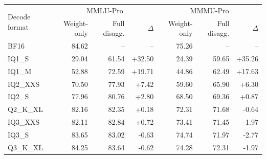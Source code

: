 \begin{tabular}{l|rrr|rrr}
\toprule
\multirow{2}{*}{Decode format} & \multicolumn{3}{c|}{MMLU-Pro} & \multicolumn{3}{c}{MMMU-Pro} \\
 & Weight-only & Full disagg. & $\Delta$ & Weight-only & Full disagg. & $\Delta$ \\
\midrule
BF16 & 84.62 & -- & -- & 75.26 & -- & -- \\
\midrule
IQ1\_S & 29.04 & 61.54 & +32.50 & 24.39 & 59.65 & +35.26 \\
IQ1\_M & 52.88 & 72.59 & +19.71 & 44.86 & 62.49 & +17.63 \\
IQ2\_XXS & 70.50 & 77.93 & +7.42 & 59.60 & 65.90 & +6.30 \\
IQ2\_S & 77.96 & 80.76 & +2.80 & 68.50 & 69.36 & +0.87 \\
Q2\_K\_XL & 82.16 & 82.35 & +0.18 & 72.31 & 71.68 & -0.64 \\
IQ3\_XXS & 82.11 & 82.84 & +0.72 & 73.41 & 71.45 & -1.97 \\
IQ3\_S & 83.65 & 83.02 & -0.63 & 74.74 & 71.97 & -2.77 \\
Q3\_K\_XL & 84.25 & 83.64 & -0.62 & 74.28 & 72.31 & -1.97 \\
\bottomrule
\end{tabular}
